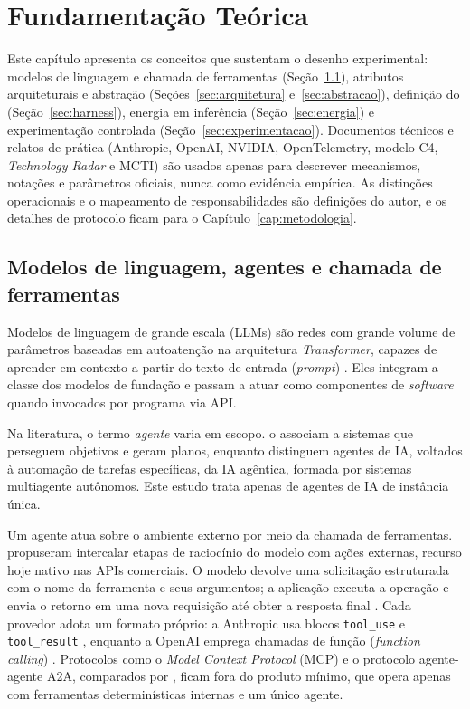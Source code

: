 \chapter{Fundamentação Teórica}
\label{cap:fundamentacao}

Este capítulo apresenta os conceitos que sustentam o desenho experimental:
modelos de linguagem e chamada de ferramentas (Seção~\ref{sec:llm-agentes}),
atributos arquiteturais e abstração
(Seções~\ref{sec:arquitetura} e~\ref{sec:abstracao}), definição do \harness{}
(Seção~\ref{sec:harness}), energia em inferência (Seção~\ref{sec:energia}) e
experimentação controlada (Seção~\ref{sec:experimentacao}). Documentos técnicos
e relatos de prática (Anthropic, OpenAI, NVIDIA, OpenTelemetry, modelo C4,
\textit{Technology Radar} e MCTI) são usados apenas para descrever mecanismos,
notações e parâmetros oficiais, nunca como evidência empírica. As distinções
operacionais e o mapeamento de responsabilidades são definições do autor, e os
detalhes de protocolo ficam para o Capítulo~\ref{cap:metodologia}.

\section{Modelos de linguagem, agentes e chamada de ferramentas}
\label{sec:llm-agentes}

Modelos de linguagem de grande escala (LLMs) são redes com grande volume de
parâmetros baseadas em autoatenção na arquitetura \textit{Transformer}, capazes
de aprender em contexto a partir do texto de entrada (\textit{prompt})
\cite{chang2024}. Eles integram a classe dos modelos de fundação
\cite{liu2025} e passam a atuar como componentes de \textit{software} quando
invocados por programa via API.

Na literatura, o termo \textit{agente} varia em escopo.  o
associam a sistemas que perseguem objetivos e geram planos, enquanto
 distinguem agentes de IA, voltados à automação de
tarefas específicas, da IA agêntica, formada por sistemas multiagente
autônomos. Este estudo trata apenas de agentes de IA de instância única.

Um agente atua sobre o ambiente externo por meio da chamada de ferramentas.
 propuseram intercalar etapas de raciocínio do modelo com
ações externas, recurso hoje nativo nas APIs comerciais. O modelo devolve uma
solicitação estruturada com o nome da ferramenta e seus argumentos; a aplicação
executa a operação e envia o retorno em uma nova requisição até obter a resposta
final \cite{anthropictools,openaifunctions}. Cada provedor adota um formato
próprio: a Anthropic usa blocos \texttt{tool\_use} e \texttt{tool\_result}
\cite{anthropictools}, enquanto a OpenAI emprega chamadas de função
(\textit{function calling}) \cite{openaifunctions}. Protocolos como o
\textit{Model Context Protocol} (MCP) e o protocolo agente-agente
A2A, comparados por , ficam fora do produto
mínimo, que opera apenas com ferramentas determinísticas internas e um único
agente.

